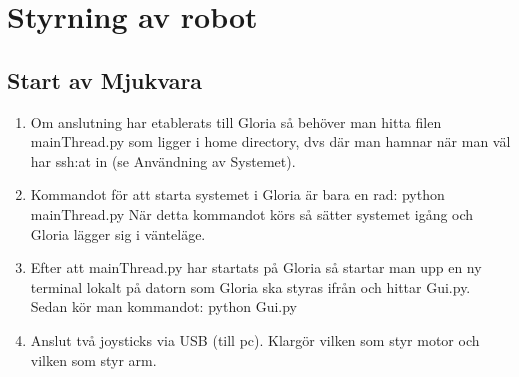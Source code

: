\section{Styrning av robot}
\subsection{Start av Mjukvara}
\begin{enumerate}
	\item Om anslutning har etablerats till Gloria så behöver man hitta filen mainThread.py som ligger i home directory, dvs där man hamnar när man väl har ssh:at in (se Användning av Systemet).
	\item Kommandot för att starta systemet i Gloria är bara en rad: python mainThread.py
	När detta kommandot körs så sätter systemet igång och Gloria lägger sig i vänteläge.
	\item Efter att mainThread.py har startats på Gloria så startar man upp en ny terminal lokalt på datorn som Gloria ska styras ifrån och hittar Gui.py. Sedan kör man kommandot: python Gui.py
	\item Anslut två joysticks via USB (till pc). Klargör vilken som styr motor och vilken som styr arm.
\end{enumerate}
